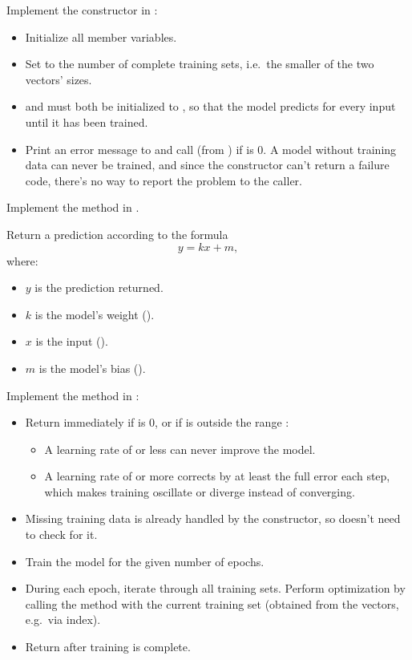 \label{c1:ex:10}
Implement the constructor in :
\begin{itemize}
  \item Initialize all member variables.
  \item Set  to the number of complete training sets, i.e.\ the smaller of the two
    vectors' sizes.
  \item {} and  must both be initialized to , so that the model
    predicts  for every input until it has been trained.
  \item Print an error message to  and call  (from
    ) if  is 0. A model without training data can never be
    trained, and since the constructor can't return a failure code, there's no way to report the
    problem to the caller.
\end{itemize}

\label{c1:ex:11}
Implement the method  in .

Return a prediction according to the formula
\[
  y = kx + m,
\]
where:
\begin{itemize}
  \item $y$ is the prediction returned.
  \item $k$ is the model's weight ().
  \item $x$ is the input ().
  \item $m$ is the model's bias ().
\end{itemize}

\label{c1:ex:12}
Implement the method  in :
\begin{itemize}
  \item Return  immediately if  is 0, or if  is
    outside the range :
  \begin{itemize}
    \item A learning rate of  or less can never improve the model.
    \item A learning rate of  or more corrects by at least the full error each step, which
      makes training oscillate or diverge instead of converging.
  \end{itemize}
  \item Missing training data is already handled by the constructor, so  doesn't
    need to check for it.
  \item Train the model for the given number of epochs.
  \item During each epoch, iterate through all  training sets. Perform
    optimization by calling the method  with the current training set (obtained
    from the vectors, e.g.\ via index).
  \item Return  after training is complete.
\end{itemize}

